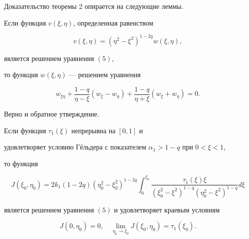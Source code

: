 Доказательство теоремы 2 опирается на следующие леммы.





\begin{lem}


Если функция $v(\xi,\eta)$, определенная равенством


$$


v(\xi,\eta)=(\eta^2-\xi^2)^{1-2q} w(\xi,\eta),


$$


является решением уравнения $(5)$,


то функция $w(\xi,\eta)$ --- решением уравнения


\begin{equation}


w_{\xi\eta}+\frac{1-q}{\eta-\xi}(w_\xi-w_\eta)+


\frac{1-q}{\eta+\xi}(w_\xi+w_\eta)=0.


\end{equation}





Верно и обратное утверждение.


\end{lem}





\begin{lem}


Если функция $\tau_1(\xi)$ непрерывна на $[0,1]$ и 


удовлетворяет условию Г\"ельдера с показателем $\alpha_1>1-q$ при $0<\xi<1$,


то функция


$$


J(\xi_0,\eta_0)=


2k_1(1-2q)(\eta_0^2-\xi_0^2)^{1-2q} \int_0^{\xi_0} \frac{\tau_1 (\xi) \xi}


{(\xi_0^2-\xi^2)^{1-q} (\eta_0^2-\xi^2)^{1-q} }d\xi


$$


является решением уравнения $(5)$ и удовлетворяет краевым условиям  


\begin{equation}


J(0,\eta_0)=0,\quad \lim_{\eta_0 \to \xi_0} J(\xi_0,\eta_0)=\tau_1(\xi_0).


\end{equation}


\end{lem}





